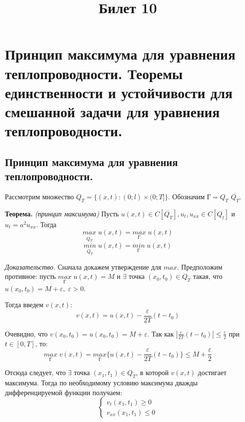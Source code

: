 \documentclass[a6paper]{article}
\title{Билет 10}
\date{}
\begin{document}
    \maketitle
    \section{Принцип максимума для уравнения теплопроводности. Теоремы единственности и устойчивости для смешанной задачи для уравнения теплопроводности.}
    \subsection{Принцип максимума для уравнения теплопроводности.}
    
    Рассмотрим множество $Q_T = \{(x, t) : (0; l) × (0; T]\}$. Обозначим $Г = Q_T$ $\overline{Q_T}$.
    \par
    \textbf{Теорема.} \textit{(принцип максимума)} Пусть $u(x,t) \in C[\overline{Q_T}], u_t, u_{xx} \in C[Q_t]$ и $u_t = a^2u_{xx}$. Тогда
    $$
    \underset{\overline{Q_T}}{max} \; u(x,t) = \underset{Г}{max} \; u(x,t)
    $$
    $$
    \underset{\overline{Q_T}}{min} \; u(x,t) = \underset{Г}{min} \; u(x,t)
    $$
    
    \textit{Доказательство.} Сначала докажем утверждение для $max$. Предположим противное: пусть $\underset{Г}{max} \; u(x,t) = M$ и $\exists$ точка $(x_0,t_0) \in Q_T$ такая, что $u(x_0,t_0)= M + \varepsilon, \; \varepsilon > 0$.
    \par
    Тогда введем $v(x,t)$:
    \begin{equation}
        \label{eq1}
        v(x,t) = u(x,t) - \frac{\varepsilon}{2T}(t - t_0)
    \end{equation}
    
    Очевидно, что $v(x_0,t_0) = u(x_0,t_0) = M + \varepsilon$. Так как $|\frac{\varepsilon}{2T}(t - t_0)| \leq \frac{\varepsilon}{2}$ при $t \in [0,T]$, то:
    $$
    \underset{Г}{max} \; v(x,t) = \underset{Г}{max} \{u(x,t) - \frac{\varepsilon}{2T}(t - t_0)\} \leq M + \frac{\varepsilon}{2}
    $$
    
    Отсюда следует, что $\exists$ точка $(x_1,t_1) \in Q_T$, в которой $v(x,t)$ достигает максимума. Тогда по необходимому условию максимума дважды дифференцируемой функции получаем:
    \begin{equation}
        \label{eq2}
        \begin{cases}
        v_t(x_1,t_1) \geq 0 \\
        v_{xx}(x_1,t_1) \leq 0
        \end{cases}
    \end{equation}
    
\end{document}
